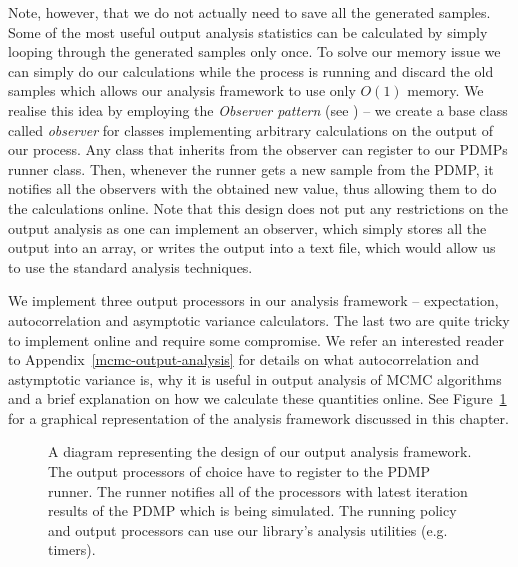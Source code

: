 \documentclass[report.tex]{subfiles}
\begin{document}
Note, however, that we do not actually need to save all the generated samples. Some of the most useful
output analysis statistics can be calculated by simply looping through the generated samples
only once. To solve our memory issue we can simply do our calculations while the process is running
and discard the old samples which allows our analysis framework to use only $O(1)$ memory.
We realise this idea by employing the \textit{Observer pattern} (see \citet{gamma1994design})
-- we create a base class called \textit{observer} for classes implementing arbitrary
calculations on the output of our process. Any class that inherits from the observer can register
to our PDMPs runner class.
Then, whenever the runner gets a new sample from the PDMP, it notifies all the observers
with the obtained new value, thus allowing them to do the calculations online.
Note that this design does not put any restrictions on the output analysis as one can implement
an observer, which simply stores all the output into an array, or writes the output into
a text file, which would allow us to use the standard analysis techniques.

We implement three output processors in our analysis framework -- expectation, autocorrelation
and asymptotic variance calculators. The last two are quite tricky to implement online
and require some compromise. We refer an interested reader to Appendix~\ref{mcmc-output-analysis}
for details on what autocorrelation and astymptotic variance is, why it
is useful in output analysis of MCMC algorithms and a brief explanation on how we calculate
these quantities online.
See Figure~\ref{figure-analysis-framework-design} for a graphical representation
of the analysis framework discussed in this chapter.

\begin{figure}
  \captionsetup{skip=1.25cm}
  \centering
  \def\svgwidth{\linewidth}
  
  \caption{A diagram representing the design of our output analysis framework.
           The output processors of choice have to register to the PDMP runner.
           The runner notifies all of the processors with latest iteration results of the PDMP which
           is being simulated.
           The running policy and output processors can use our library's analysis utilities (e.g. timers).}
  \label{figure-analysis-framework-design}
\end{figure}
\end{document}
